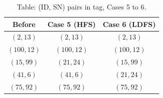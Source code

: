 \begin{table}
\caption{Table: (ID, SN) pairs in tag, Cases 5 to 6.}
\label{Table: (ID, SN) pairs in tag, Cases 5 to 6.}
\begin{center}
\begin{tabular}{|c|c|c|}
\hline
Before & Case 5 (HFS) & Case 6 (LDFS) \\
\hline
$(2, 13)$     & $(2, 13)$     & $(2, 13)$  \\
$(100, 12)$ & $(100, 12)$ & $(100, 12)$  \\
$(15, 99)$   & $(21, 24)$   & $(15, 99)$ \\
$(41, 6)$     & $(41, 6)$     & $(21, 24)$ \\
$(75, 92)$   & $(75, 92)$   & $(75, 92)$ \\
\hline
\end{tabular}
\end{center}
\end{table}

